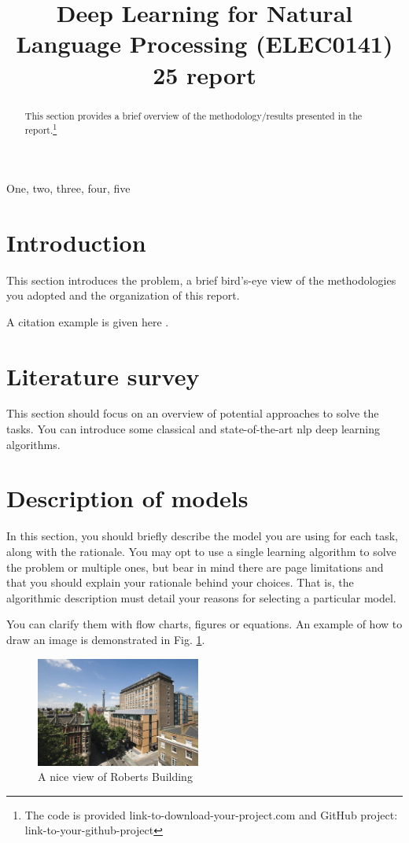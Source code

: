 \documentclass{article}
\title{Deep Learning for Natural Language Processing (ELEC0141) 25 report}
\begin{document}
%
\maketitle
%
\begin{abstract}
    This section provides a brief overview of the methodology/results presented in the report.\footnote{The code is provided link-to-download-your-project.com and GitHub project: link-to-your-github-project}
\end{abstract}
%
\begin{keywords}
    One, two, three, four, five
\end{keywords}
%

\section{Introduction}
\label{sec:intro}
    This section introduces the problem, a brief bird's-eye view of the methodologies you adopted and the organization of this report.
    
    A citation example is given here \cite{C2}.


\section{Literature survey}
\label{sec:lite}
    This section should focus on an overview of potential approaches to solve the tasks. You can introduce some classical and state-of-the-art nlp deep learning algorithms.


\section{Description of models}
\label{sec:models}
    In this section, you should briefly describe the model you are using for each task, along with the rationale. You may opt to use a single learning algorithm to solve the problem or multiple ones, but bear in mind there are page limitations and that you should explain your rationale behind your choices. That is, the algorithmic description must detail your reasons for selecting a particular model.
    
    You can clarify them with flow charts, figures or equations. An example of how to draw an image is demonstrated in Fig. \ref{fig:roberts_building}.
    
    \begin{figure}[htb]
    \centering
    \includegraphics[width=0.48\textwidth]{images/Roberts_building.jpg}
    \caption{A nice view of Roberts Building}
    \label{fig:roberts_building}
    \end{figure}
    
\end{document}
